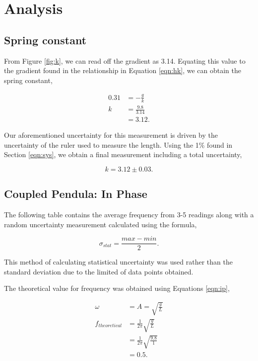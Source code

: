\documentclass{article}
\begin{document}
\FloatBarrier

\section{Analysis}
\subsection{Spring constant}
From Figure \ref{fig:k}, we can read off the gradient as 3.14. 
Equating this value to the gradient found in the relationship
in Equation \ref{eqn:hk}, we can obtain the spring constant,

\begin{equation}
    \begin{split}
        0.31 &= -\frac{g}{k} \\
        k &= \frac{9.8}{3.14} \\
        &= 3.12.
    \end{split}
\end{equation}

Our aforementioned uncertainty for this measurement is driven 
by the uncertainty of the ruler used to measure the length. Using
the 1\% found in Section \ref{eqn:sys}, we obtain a final measurement
including a total uncertainty,

\begin{equation}
    k = 3.12 \pm 0.03.
\end{equation}

\subsection{Coupled Pendula: In Phase}

The following table contains the average frequency from 3-5 readings
along with a random uncertainty measurement calculated using the 
formula,

\begin{equation}
    \sigma_{stat} = \frac{max - min}{2}.
\end{equation}

This method of calculating statistical uncertainty was used rather
than the standard deviation due to the limited of data points obtained.

The theoretical value for frequency was obtained using Equations \ref{eqn:ip},

\begin{equation}
    \begin{split}
        \omega &= A = \sqrt{\frac{g}{L}} \\
        f_{theoretical} &= \frac{1}{2\pi}\sqrt{\frac{g}{L}} \\
        &= \frac{1}{2\pi}\sqrt{\frac{9.8}{1}} \\
        &= 0.5. 
    \end{split}
\end{equation}
\end{document}
